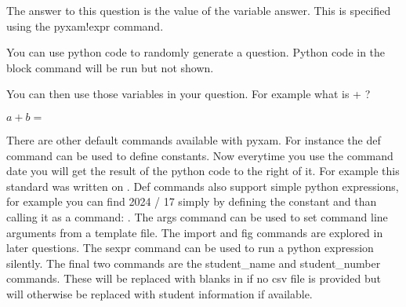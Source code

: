 \documentclass[12pt]{exam}
\begin{document}
\begin{questions}
\begin{comment}
                \end{comment}
                The answer to this question is the value of the variable answer. This is specified using the pyxam!expr
                command.
                \begin{solution}
                \end{solution}

                You can use python code to randomly generate a question. Python code in the block command will be run but not
                shown.
                \begin{comment} pyxam!block

import random

a = random.randint(0, 32)
b = random.randint(0, 32)

                \end{comment}
                You can then use those variables in your question. For example what is
                +
                ?
                \begin{solution}
                    $a + b =
                    $
                \end{solution}

                There are other default commands available with pyxam. For instance the def command can be used to define constants.
                Now everytime you use the command date you will get the result of the python code to the right of it. For example
                this standard was written on
                . Def commands also support simple python expressions, for example you can find 2024 / 17
                simply by defining the constant and than calling it as a command:
                . The args command can be used to set command line arguments from a template file. The import  and fig commands
                are explored in later questions. The sexpr command can be used to run a python expression silently. The
                final two commands are the student\_name and student\_number commands. These will be replaced with blanks in
                if no csv file is provided but will otherwise be replaced with student information if available.


\end{questions}
\end{document}
